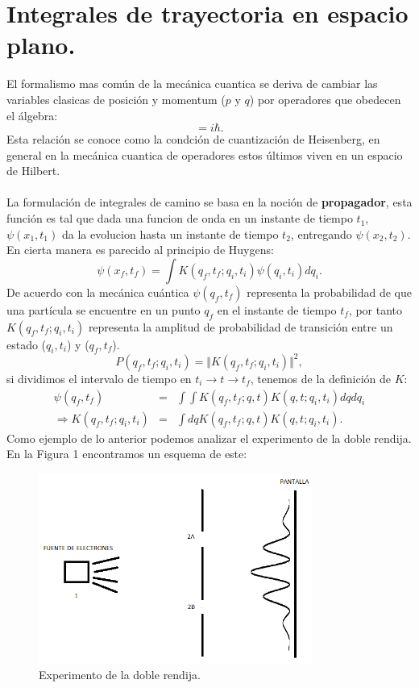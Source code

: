 \chapter{Integrales de trayectoria	 en espacio plano.}
El formalismo mas común de la mecánica cuantica se deriva de cambiar las variables clasicas de posición y momentum ($p$ y $q$) por operadores que obedecen el álgebra:
\begin{equation}
[\hat{q},\hat{p}]=i\hbar.
\end{equation}
Esta relación se conoce como la condción de cuantización de Heisenberg, en general en la mecánica cuantica de operadores estos últimos viven en un espacio de Hilbert.
\\
\\
La formulación de integrales de camino se basa en la noción de \textbf{propagador}, esta función es tal que dada una funcion de onda en un instante de tiempo $t_1$, $\psi(x_1,t_1)$ da la evolucion hasta un instante de tiempo $t_2$, entregando $\psi(x_2,t_2)$. En cierta manera es parecido al principio de Huygens:
\begin{equation}
\psi(x_f,t_f)=\int K(q_f,t_f;q_i,t_i)\psi(q_i,t_i)dq_i.
\end{equation}
De acuerdo con la mecánica cuántica $\psi(q_f,t_f)$ representa la probabilidad de que una partícula se encuentre en un punto $q_f$ en el instante de tiempo $t_f$, por tanto $K(q_f,t_f;q_i,t_i)$ representa la amplitud de probabilidad de transición entre un estado ($q_i,t_i$) y ($q_f,t_f$).
\begin{equation}
P(q_f,t_f;q_i,t_i)=\Vert K(q_f,t_f;q_i,t_i) \Vert^2,
\end{equation}
si dividimos el intervalo de tiempo en $t_i\rightarrow t \rightarrow t_f$, tenemos de la definición de $K$:
\begin{eqnarray}
\nonumber \psi(q_f,t_f)&=&\int\int K(q_f,t_f;q,t)K(q,t;q_i,t_i)dqdq_i\\
\Rightarrow K(q_f,t_f;q_i,t_i)&=&\int dq K(q_f,t_f;q,t)K(q,t;q_i,t_i).
\end{eqnarray}
Como ejemplo de lo anterior podemos analizar el experimento de la doble rendija. En la Figura 1 encontramos un esquema de este:
\begin{figure}[h]
\centering
\includegraphics[width=9cm]{Imagenes/Fig1}
\caption[Esquema del experimento de la doble rendija]{Experimento de la doble rendija.}
\end{figure}
